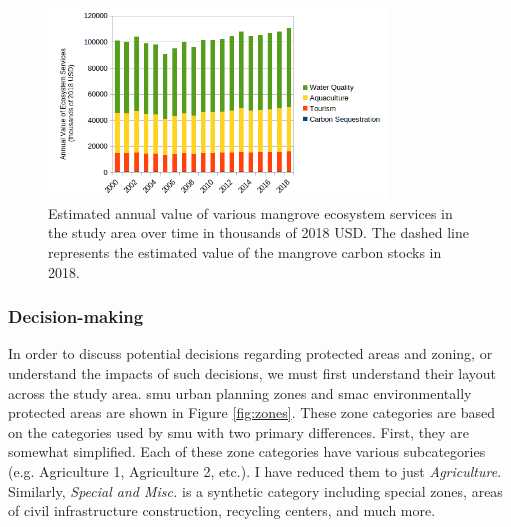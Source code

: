 \begin{figure}[!htb] 
\centering
\includegraphics[width=0.8\textwidth]{Figures/chap4/annual_ecosystem_services.png}
\caption[Annual Value of Mangrove Ecosystem Services]{Estimated annual value of various mangrove ecosystem services in the study area over time in thousands of 2018 USD. The dashed line represents the estimated value of the mangrove carbon stocks in 2018.}
\label{fig:annual_ecosystem_services}
\end{figure}


\subsubsection{Decision-making} \label{sec:rio-evdt-decision-results}

In order to discuss potential decisions regarding protected areas and zoning, or understand the impacts of such decisions, we must first understand their layout across the study area. \ac{smu} urban planning zones \cite{institutopereirapassosAreasProtegidas2021} and \ac{smac} environmentally protected areas \cite{institutopereirapassosSetores2022} are shown in Figure \ref{fig:zones}. These zone categories are based on the categories used by \ac{smu} with two primary differences. First, they are somewhat simplified. Each of these zone categories have various subcategories (e.g. Agriculture 1, Agriculture 2, etc.). I have reduced them to just \textit{Agriculture}. Similarly, \textit{Special and Misc.} is a synthetic category including special zones, areas of civil infrastructure construction, recycling centers, and much more. 

